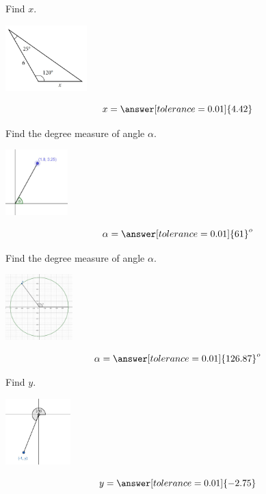 \documentclass{ximera}
\begin{document}
\begin{problem}\label{prob:160test4prob4}
 Find $x$.
 
 \begin{image}
   
\includegraphics[height=1in]{test4diagram4.jpg}

\end{image}
$$x=\answer[tolerance=0.01]{4.42}$$
\end{problem}

\begin{problem}\label{prob:160test4prob5}
 Find the degree measure of angle $\alpha$.  
 
 \begin{image}
   
\includegraphics[height=1in]{test4diagram5.jpg}

\end{image}
$$\alpha=\answer[tolerance=0.01]{61}^o$$
\end{problem}

\begin{problem}\label{prob:160test4prob6}
 Find the degree measure of angle $\alpha$.  
 
 \begin{image}
   
\includegraphics[height=1in]{test4diagram8.jpg}

\end{image}
$$\alpha=\answer[tolerance=0.01]{126.87}^o$$

\end{problem}

\begin{problem}\label{prob:160test4prob7}
 Find $y$.
 
 \begin{image}
   
\includegraphics[height=1in]{test4diagram9.jpg}

\end{image}
$$y=\answer[tolerance=0.01]{-2.75}$$

\end{problem}
 
 
\end{document}
